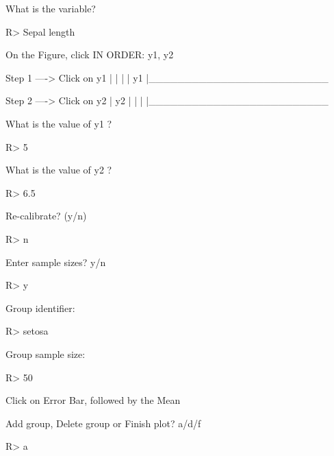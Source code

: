 \documentclass[article]{jss}
\begin{document}
\begin{CodeChunk}
\begin{CodeOutput}
What is the variable? 
\end{CodeOutput}
\begin{CodeInput}
R> Sepal length
\end{CodeInput}
\begin{CodeOutput}
On the Figure, click IN ORDER: 
      y1, y2  


    Step 1 ----> Click on y1
  |
  |
  |
  |
  y1
  |_________________________


    Step 2 ----> Click on y2
  |
  y2
  |
  |
  |
  |_________________________
  
What is the value of y1 ?
\end{CodeOutput}
\begin{CodeInput}
R> 5
\end{CodeInput}
\begin{CodeOutput}
What is the value of y2 ?
\end{CodeOutput}
\begin{CodeInput}
R> 6.5
\end{CodeInput}
\begin{CodeOutput}
Re-calibrate? (y/n) 
\end{CodeOutput}
\begin{CodeInput}
R> n
\end{CodeInput}
\begin{CodeOutput}
Enter sample sizes? y/n 
\end{CodeOutput}
\begin{CodeInput}
R> y
\end{CodeInput}
\begin{CodeOutput}
Group identifier: 
\end{CodeOutput}
\begin{CodeInput}
R> setosa
\end{CodeInput}
\begin{CodeOutput}
Group sample size: 
\end{CodeOutput}
\begin{CodeInput}
R> 50
\end{CodeInput}
\begin{CodeOutput}
Click on Error Bar, followed by the Mean

Add group, Delete group or Finish plot? a/d/f 
\end{CodeOutput}
\begin{CodeInput}
R> a
\end{CodeInput}
\end{CodeChunk}
\end{document}

